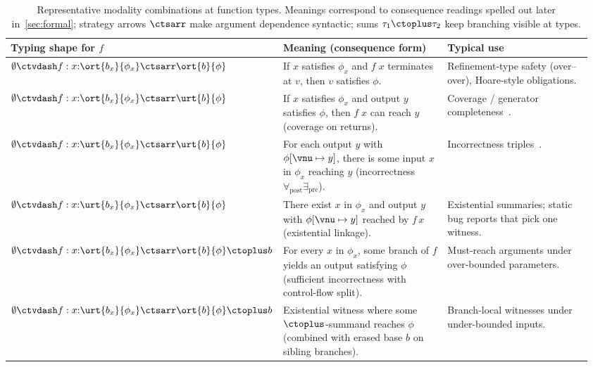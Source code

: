 \begin{table}[ht!]
  \centering
  \caption{Representative modality combinations at function types. Meanings correspond to consequence readings spelled out later in~\autoref{sec:formal}; strategy arrows \(\ctsarr\) make argument dependence syntactic; sums \(\tau_1 \ctoplus \tau_2\) keep branching visible at types.}
  \label{tab:four-modal-combinations}
  \scriptsize
  \setlength{\tabcolsep}{5pt}
  \begin{tabular}{@{}>{\raggedright\arraybackslash}p{0.29\linewidth}>{\raggedright\arraybackslash}p{0.36\linewidth}>{\raggedright\arraybackslash}p{0.31\linewidth}@{}}
    \toprule
    \textbf{Typing shape for \(f\)} & \textbf{Meaning (consequence form)} & \textbf{Typical use} \\
    \midrule
    $\emptyset \ctvdash f : x{:}\ort{b_x}{\phi_x} \ctsarr \ort{b}{\phi}$ &
    If $x$ satisfies $\phi_x$ and $f\;x$ terminates at $v$, then $v$ satisfies $\phi$. &
    Refinement-type safety (over--over), Hoare-style obligations. \\
    $\emptyset \ctvdash f : x{:}\ort{b_x}{\phi_x} \ctsarr \urt{b}{\phi}$ &
    If $x$ satisfies $\phi_x$ and output $y$ satisfies $\phi$, then $f\;x$ can reach \(y\) (coverage on returns). &
    Coverage / generator completeness~\cite{CoverageType}. \\
    $\emptyset \ctvdash f : x{:}\urt{b_x}{\phi_x} \ctsarr \urt{b}{\phi}$ &
    For each output \(y\) with \(\phi[\vnu\mapsto y]\), there is some input \(x\) in \(\phi_x\) reaching \(y\) (incorrectness \(\forall_{\mathrm{post}}\exists_{\mathrm{pre}}\)). &
    Incorrectness triples~\cite{OHP19}. \\
    $\emptyset \ctvdash f : x{:}\urt{b_x}{\phi_x} \ctsarr \ort{b}{\phi}$ &
    There exist \(x\) in \(\phi_x\) and output \(y\) with \(\phi[\vnu\mapsto y]\) reached by \(f\,x\) (existential linkage).&
    Existential summaries; static bug reports that pick one witness. \\
    $\emptyset \ctvdash f : x{:}\ort{b_x}{\phi_x} \ctsarr \ort{b}{\phi} \ctoplus b$ &
    For every \(x\) in \(\phi_x\), some branch of \(f\) yields an output satisfying \(\phi\) (sufficient incorrectness with control-flow split). &
    Must-reach arguments under over-bounded parameters. \\
    $\emptyset \ctvdash f : x{:}\urt{b_x}{\phi_x} \ctsarr \ort{b}{\phi} \ctoplus b$ &
    Existential witness where some \(\ctoplus\)-summand reaches \(\phi\) (combined with erased base \(b\) on sibling branches). &
    Branch-local witnesses under under-bounded inputs. \\
    \bottomrule
  \end{tabular}
\end{table}

